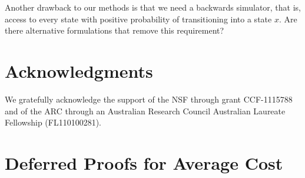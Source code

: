 \documentclass[11pt]{article}
\begin{document}
Another drawback to our methods is that we need a backwards simulator, that is, access to every state with positive probability of transitioning into a state $x$. Are there alternative formulations that remove this requirement?




\section{Acknowledgments}
We gratefully acknowledge the support of the NSF through grant CCF-1115788 and of the ARC through an Australian Research Council Australian Laureate Fellowship (FL110100281).


\appendix

\section{Deferred Proofs for Average Cost}
\label{sec:average.cost.proofs}
\end{document}
